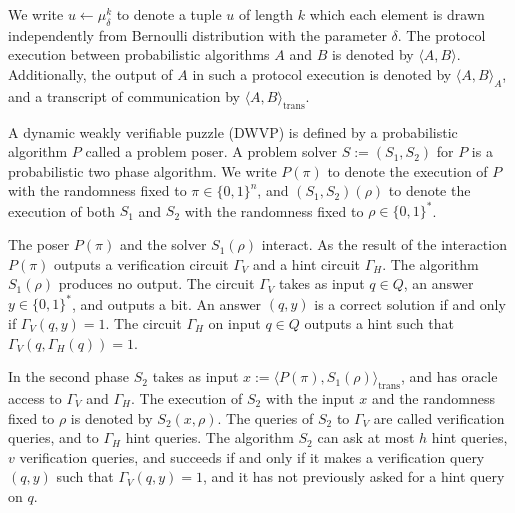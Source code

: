 %
%
\noindent
We write $u \leftarrow \mu_{\delta}^k$ to denote a tuple $u$ of length $k$ which each element
is drawn independently from Bernoulli distribution with the parameter $\delta$.
The protocol execution between probabilistic algorithms $A$ and $B$ is denoted by $\langle A, B \rangle$.
Additionally, the output of $A$ in such a protocol execution is denoted by $\langle A, B \rangle_A$, and a transcript
of communication by $\langle A, B \rangle_{\text{trans}}$.
%
\begin{definition}
  \label{def:dwvp}
  A dynamic weakly verifiable puzzle (DWVP) is defined by a probabilistic algorithm $P$
  called a problem poser.
  A problem solver $S := (S_1, S_2)$ for $P$ is a probabilistic two phase algorithm.
  We write $P(\pi)$ to denote the execution of $P$ with the randomness fixed to $\pi \in \{0,1\}^n$, and $(S_1,S_2)(\rho)$
  to denote the execution of both $S_1$ and $S_2$ with the randomness fixed to $\rho \in \{0,1\}^{*}$.

  The poser $P(\pi)$ and the solver $S_1(\rho)$ interact.
  As the result of the interaction $P(\pi)$ outputs a verification circuit $\Gamma_{V}$ and a hint circuit $\Gamma_{H}$.
  The algorithm $S_1(\rho)$ produces no output.
  The circuit $\Gamma_{V}$ takes as input $q \in Q$, an answer $y \in \{0,1\}^*$,
  and outputs a bit. An answer $(q,y)$ is a correct solution if and only if $\Gamma_V(q,y) = 1$.
  The circuit $\Gamma_H$ on input $q \in Q$ outputs a hint such that $\Gamma_V(q,\Gamma_H(q)) = 1$.

  In the second phase $S_2$ takes as input $x := \langle P(\pi), S_1(\rho) \rangle_{\text{trans}}$,
  and has oracle access to $\Gamma_V$ and $\Gamma_H$.
  The execution of $S_2$ with the input $x$ and the randomness fixed to $\rho$
  is denoted by $S_2(x, \rho)$. The queries of $S_2$ to $\Gamma_V$ are called verification queries, and to $\Gamma_H$ hint queries.
  The algorithm $S_2$ can ask at most $h$ hint queries, $v$ verification queries, and succeeds if and only if
  it makes a verification query $(q,y)$ such that $\Gamma_V(q,y) = 1$, and it has not previously asked for a hint query on $q$.
\end{definition}
%
